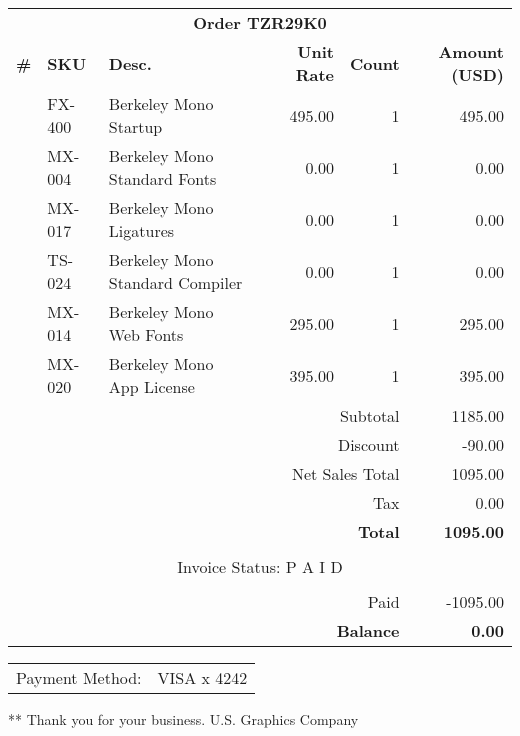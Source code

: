 \documentclass{article}
\newcounter{linenum}
\newcommand{\lineitem}[5]{%
    \stepcounter{linenum}%
    \thelinenum & #1 & #2 & & #3 & #4 & #5\\
}
\begin{document}
\begin{longtable}{r l p{3in} l r r r}
\multicolumn{7}{c}{\textbf{Order TZR29K0}}\\
\textbf{\#} & \textbf{SKU} & \textbf{Desc.} & & \textbf{Unit Rate} & \textbf{Count} & \textbf{Amount (USD)}\\
\hline
\lineitem{FX-400}{Berkeley Mono Startup}{495.00}{1}{495.00}
\lineitem{MX-004}{Berkeley Mono Standard Fonts}{0.00}{1}{0.00}
\lineitem{MX-017}{Berkeley Mono Ligatures}{0.00}{1}{0.00}
\lineitem{TS-024}{Berkeley Mono Standard Compiler}{0.00}{1}{0.00}
\lineitem{MX-014}{Berkeley Mono Web Fonts}{295.00}{1}{295.00}
\lineitem{MX-020}{Berkeley Mono App License}{395.00}{1}{395.00}
\hline
\multicolumn{6}{r}{Subtotal} & 1185.00\\
\multicolumn{6}{r}{Discount} & -90.00\\
\hline
\multicolumn{6}{r}{Net Sales Total} & 1095.00\\
\multicolumn{6}{r}{Tax} & 0.00\\
\hline\hline
\multicolumn{6}{r}{\textbf{Total}} & \textbf{1095.00}\\
\multicolumn{7}{r}{}\\
\multicolumn{7}{c}{Invoice Status: P A I D}\\
\multicolumn{7}{r}{}\\
\hline
\multicolumn{6}{r}{Paid} & -1095.00\\
\hline
\multicolumn{6}{r}{\textbf{Balance}} & \textbf{0.00}\\
\end{longtable}

\noindent
\begin{tabular}{@{}ll@{}}
Payment Method: & VISA x 4242\\
\end{tabular}
\center ***
\center Thank you for your business.
\center U.S. Graphics Company
\end{document}
